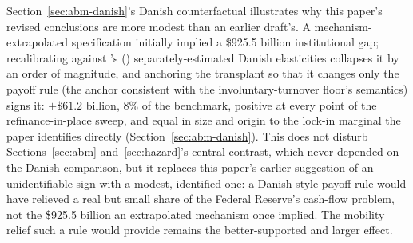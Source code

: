 \documentclass[12pt]{article}
\newcommand{\citepos}[1]{\citeauthor{#1}'s (\citeyear{#1})}
\begin{document}
Section~\ref{sec:abm-danish}'s Danish counterfactual illustrates why this paper's revised conclusions are more modest than an earlier draft's. A mechanism-extrapolated specification initially implied a \$925.5 billion institutional gap; recalibrating against \citepos{berger2026} separately-estimated Danish elasticities collapses it by an order of magnitude, and anchoring the transplant so that it changes only the payoff rule (the anchor consistent with the involuntary-turnover floor's semantics) signs it: $+\$61.2$ billion, 8\% of the benchmark, positive at every point of the refinance-in-place sweep, and equal in size and origin to the lock-in marginal the paper identifies directly (Section~\ref{sec:abm-danish}). This does not disturb Sections~\ref{sec:abm} and~\ref{sec:hazard}'s central contrast, which never depended on the Danish comparison, but it replaces this paper's earlier suggestion of an unidentifiable sign with a modest, identified one: a Danish-style payoff rule would have relieved a real but small share of the Federal Reserve's cash-flow problem, not the \$925.5 billion an extrapolated mechanism once implied. The mobility relief such a rule would provide remains the better-supported and larger effect.
\end{document}
